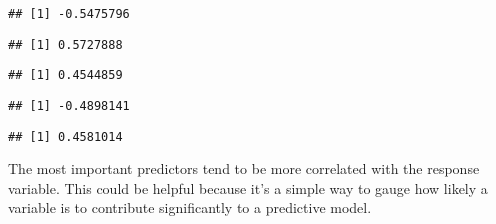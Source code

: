 \documentclass[
]{article}
\newenvironment{Shaded}{\begin{snugshade}}{\end{snugshade}}
\newcommand{\FunctionTok}[1]{\textcolor[rgb]{0.00,0.00,0.00}{#1}}
\newcommand{\NormalTok}[1]{#1}
\newcommand{\SpecialCharTok}[1]{\textcolor[rgb]{0.00,0.00,0.00}{#1}}
\begin{document}
\begin{Shaded}
\end{Shaded}

\begin{verbatim}
## [1] -0.5475796
\end{verbatim}

\begin{Shaded}
\end{Shaded}

\begin{verbatim}
## [1] 0.5727888
\end{verbatim}

\begin{Shaded}
\end{Shaded}

\begin{verbatim}
## [1] 0.4544859
\end{verbatim}

\begin{Shaded}
\end{Shaded}

\begin{verbatim}
## [1] -0.4898141
\end{verbatim}

\begin{Shaded}
\end{Shaded}

\begin{verbatim}
## [1] 0.4581014
\end{verbatim}

The most important predictors tend to be more correlated with the
response variable. This could be helpful because it's a simple way to
gauge how likely a variable is to contribute significantly to a
predictive model.
\end{document}
